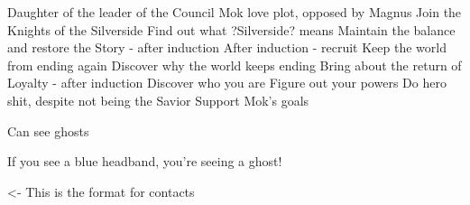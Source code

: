\documentclass[char]{Silversiders}
\begin{document}
\name{\cTruth{}}

Daughter of the leader of the Council
Mok love plot, opposed by Magnus
Join the Knights of the Silverside
Find out what ?Silverside? means
Maintain the balance and restore the Story - after induction
After induction - recruit
Keep the world from ending again
Discover why the world keeps ending
Bring about the return of Loyalty - after induction
Discover who you are
Figure out your powers
Do hero shit, despite not being the Savior
Support Mok's goals

Can see ghosts

\begin{itemz}[Goals]
	\item 
\end{itemz}

\begin{itemz}[Notes]
	\item If you see a blue headband, you're seeing a ghost!
\end{itemz}

\begin{contacts}
	\contact{\cTest{}} <- This is the format for contacts 
\end{contacts}
\end{document}

